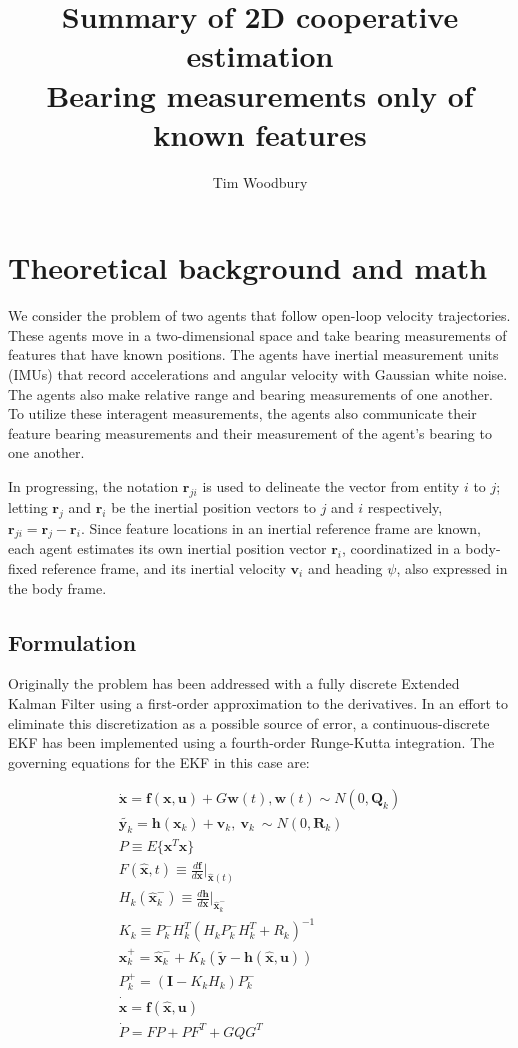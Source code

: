\documentclass{aiaa-tc}
\title{Summary of 2D cooperative estimation \\ \large{Bearing measurements only of known features}}
\author{Tim Woodbury}
\newcommand{\B}[1]{\textbf{#1}} %
\newcommand{\ddarg}[2]{\frac{d#1}{d#2}} %
\begin{document}
\maketitle

\section{Theoretical background and math}

We consider the problem of two agents that follow open-loop velocity trajectories. These agents move in a two-dimensional space and take bearing measurements of features that have known positions. The agents have inertial measurement units (IMUs) that record accelerations and angular velocity with Gaussian white noise. The agents also make relative range and bearing measurements of one another. To utilize these interagent measurements, the agents also communicate their feature bearing measurements and their measurement of the agent's bearing to one another.

In progressing, the notation $\B{r}_{ji}$ is used to delineate the vector from entity $i$ to $j$; letting $\B{r}_j$ and $\B{r}_i$ be the inertial position vectors to $j$ and $i$ respectively, $\B{r}_{ji} = \B{r}_j - \B{r}_i$. Since feature locations in an inertial reference frame are known, each agent estimates its own inertial position vector $\B{r}_i$, coordinatized in a body-fixed reference frame, and its inertial velocity $\B{v}_i$ and heading $\psi$, also expressed in the body frame. 

\subsection{Formulation}

Originally the problem has been addressed with a fully discrete Extended Kalman Filter using a first-order approximation to the derivatives. In an effort to eliminate this discretization as a possible source of error, a continuous-discrete EKF has been implemented using a fourth-order Runge-Kutta integration. The governing equations for the EKF in this case are\cite{crassidis2011}:

\begin{align}
\dot{\B{x}} = \B{f}(\B{x},\B{u}) + G \B{w}(t), \B{w}(t) \sim N(0,\B{Q}_k)  \\
\tilde{\B{y}_k} = \B{h}(\B{x}_k) + \B{v}_k, \ \B{v}_k \ \sim N(0,\B{R}_k)\\
P \equiv E\{ \B{x}^T \B{x} \} \\
F(\hat{\B{x}},t) \equiv \ddarg{\B{f}}{\B{x}} |_{\hat{\B{x}}(t)} \\
H_k (\hat{\B{x}}_k^-) \equiv \ddarg{\B{h}}{\B{x}} |_{\hat{\B{x}}_k^-} \\
K_k \equiv P_k^-H_k^T(H_kP_k^-H_k^T + R_k)^{-1}\\
\hline
\hat{\B{x}}_k^+ = \hat{\B{x}}_k^- + K_k(\tilde{\B{y}} - \B{h}(\hat{\B{x}},\B{u}))\\
P_k^+ = (\B{I} - K_k H_k)P_k^-\\
\hline
\dot{\hat{\B{x}}} = \B{f}(\hat{\B{x}},\B{u}) \\
\dot{P} = FP+PF^T+GQG^T
\end{align}
\end{document}
